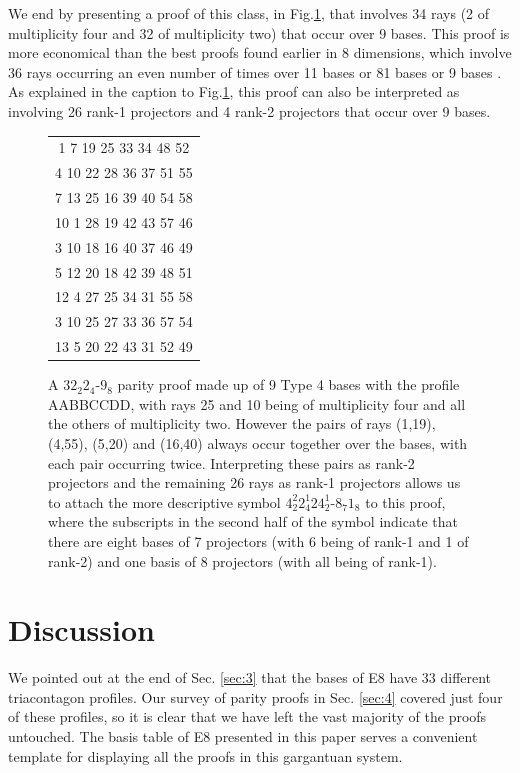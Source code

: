 We end by presenting a proof of this class, in Fig.\ref{tab9}, that involves 34 rays (2 of multiplicity four and 32 of multiplicity two) that occur over 9 bases. This proof is more economical than the best proofs found earlier in 8 dimensions, which involve 36 rays occurring an even number of times over 11 bases\cite{KP1995} or 81 bases\cite{cabello2005} or 9 bases\cite{Waegell2012a} . As explained in the caption to Fig.\ref{tab9}, this proof can also be interpreted as involving 26 rank-1 projectors and 4 rank-2 projectors that occur over 9 bases.\\

\begin{figure}[ht]
\centering %
\begin{tabular}{|c |} %
\hline %
1	7	19	25	33	34	48	52\\
4	10	22	28	36	37	51	55\\
7	13	25	16	39	40	54	58\\
10	1	28	19	42	43	57	46\\
3	10	18	16	40	37	46	49\\
5	12	20	18	42	39	48	51\\
12	4	27	25	34	31	55	58\\
3	10	25	27	33	36	57	54\\
13	5	20	22	43	31	52	49\\
\hline
\end{tabular}
\caption{A $32_{2}2_{4}$-$9_{8}$ parity proof made up of 9 Type 4 bases with the profile AABBCCDD, with rays 25 and 10 being of multiplicity four and all the others of multiplicity two. However the pairs of rays (1,19), (4,55), (5,20) and (16,40) always occur together over the bases, with each pair occurring twice. Interpreting these pairs as rank-2 projectors and the remaining 26 rays as rank-1 projectors allows us to attach the more descriptive symbol $4^{2}_{2}2^{1}_{4}24^{1}_{2}$-$8_{7}1_{8}$ to this proof, where the subscripts in the second half of the symbol indicate that there are eight bases of 7 projectors (with 6 being of rank-1 and 1 of rank-2) and one basis of 8 projectors (with all being of rank-1).}
\label{tab9}
\end{figure}

\section{\label{sec:5}Discussion}

We pointed out at the end of Sec. \ref{sec:3} that the bases of E8 have 33 different triacontagon profiles. Our survey of parity proofs in Sec. \ref{sec:4} covered just four of these profiles, so it is clear that we have left the vast majority of the proofs untouched. The basis table of E8 presented in this paper serves a convenient template for displaying all the proofs in this gargantuan system.\\

